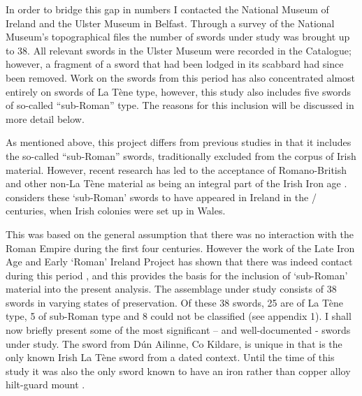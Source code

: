 In order to bridge this gap in numbers I contacted the National Museum of Ireland and the Ulster Museum in Belfast. 
Through a survey of the National Museum’s topographical files the number of swords under study was brought up to \num{38}. 
All relevant swords in the Ulster Museum were recorded in the Catalogue; 
however, a fragment of a sword that had been lodged in its scabbard had since been removed. 
Work on the swords from this period has also concentrated almost entirely on swords of La Tène type, however, this study also includes five swords of so-called “sub-Roman” type. 
The reasons for this inclusion will be discussed in more detail below.


As mentioned above, this project differs from previous studies in that it includes the so-called “sub-Roman” swords, traditionally excluded from the corpus of Irish material. However, recent research has led to the acceptance of Romano-British and other non-La Tène material as being an integral part of the Irish Iron age 
. 
\textcite[95]{Rynne1982} considers these ‘sub-Roman’ swords to have appeared in Ireland in the / centuries\AD, 
when Irish colonies were set up in Wales.

This was based on the general assumption that there was no interaction with the Roman Empire during the first four centuries\AD. 
However the work of the Late Iron Age and Early ‘Roman’ Ireland Project has shown that there was indeed contact during this period 
\parencite[esp. chapters 7--8]{CahillWilson2014}, 
and this provides the basis for the inclusion of ‘sub-Roman’ material into the present analysis. 
The assemblage under study consists of \num{38} swords in varying states of preservation. 
Of these \num{38} swords, \num{25} are of La Tène type, \num{5} of sub-Roman type and 8 could not be classified (see appendix 1). 
I shall now briefly present some of the most significant – and well-documented - swords under study. 
The sword from Dún Ailinne, Co Kildare, is unique in that is the only known Irish La Tène sword from a dated context. 
Until the time of this study it was also the only sword known to have an iron rather than copper alloy hilt-guard mount 
\parencite[88\psq]{Johnston2007}. 

